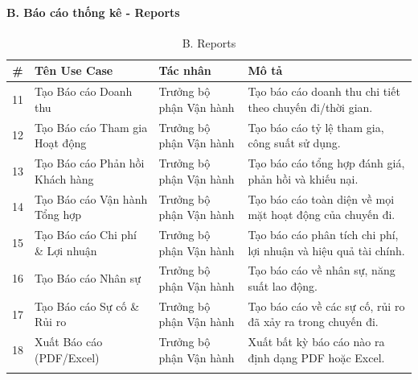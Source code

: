 \documentclass[12pt,a4paper]{article}
\begin{document}
	\paragraph{B. Báo cáo thống kê - Reports}
	\begin{longtable}{|c|p{4.5cm}|p{3.5cm}|p{4.5cm}|}
		\hline
		\textbf{\#} & \textbf{Tên Use Case} & \textbf{Tác nhân} & \textbf{Mô tả} \\
		\hline
		11 & Tạo Báo cáo Doanh thu & Trưởng bộ phận Vận hành & Tạo báo cáo doanh thu chi tiết theo chuyến đi/thời gian. \\
		\hline
		12 & Tạo Báo cáo Tham gia Hoạt động & Trưởng bộ phận Vận hành & Tạo báo cáo tỷ lệ tham gia, công suất sử dụng. \\
		\hline
		13 & Tạo Báo cáo Phản hồi Khách hàng & Trưởng bộ phận Vận hành & Tạo báo cáo tổng hợp đánh giá, phản hồi và khiếu nại. \\
		\hline
		14 & Tạo Báo cáo Vận hành Tổng hợp & Trưởng bộ phận Vận hành & Tạo báo cáo toàn diện về mọi mặt hoạt động của chuyến đi. \\
		\hline
		15 & Tạo Báo cáo Chi phí \& Lợi nhuận & Trưởng bộ phận Vận hành & Tạo báo cáo phân tích chi phí, lợi nhuận và hiệu quả tài chính. \\
		\hline
		16 & Tạo Báo cáo Nhân sự & Trưởng bộ phận Vận hành & Tạo báo cáo về nhân sự, năng suất lao động. \\
		\hline
		17 & Tạo Báo cáo Sự cố \& Rủi ro & Trưởng bộ phận Vận hành & Tạo báo cáo về các sự cố, rủi ro đã xảy ra trong chuyến đi. \\
		\hline
		18 & Xuất Báo cáo (PDF/Excel) & Trưởng bộ phận Vận hành & Xuất bất kỳ báo cáo nào ra định dạng PDF hoặc Excel. \\
		\hline
		\caption*{B. Reports}
	\end{longtable}
	
\end{document}
